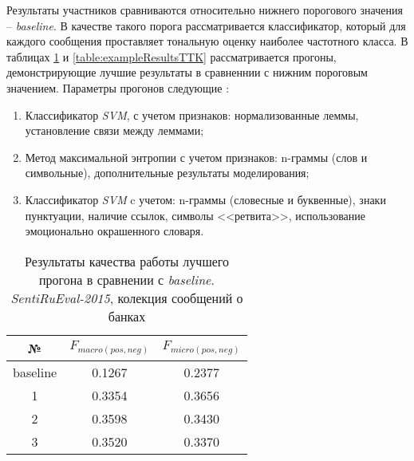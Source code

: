     Результаты участников сравниваются относительно нижнего порогового значения -- {\it baseline}.
    В качестве такого порога рассматривается классификатор, который для каждого
    сообщения проставляет тональную оценку наиболее частотного класса. В таблицах
    \ref{table:exampleResultsBanks} и \ref{table:exampleResultsTTK} рассматривается
    прогоны, демонстрирующие лучшие результаты в сравненнии с нижним пороговым
    значением. Параметры прогонов следующие \cite{tonalityAnalisys}:
    \begin{enumerate}
        \item Классификатор {\it SVM}, с учетом признаков:
            нормализованные леммы, установление связи между леммами;
        \item Метод максимальной энтропии с учетом признаков:
            n-граммы (слов и символьные), дополнительные результаты моделирования;
        \item Классификатор {\it SVM} c учетом: n-граммы (словесные и буквенные),
            знаки пунктуации, наличие ссылок, символы <<ретвита>>, использование
            эмоционально окрашенного словаря.
    \end{enumerate}

    \begin{table}[H]
        \centering
        \caption{Результаты качества работы лучшего прогона в сравнении с {\it baseline}.
        {\it SentiRuEval-2015}, колекция сообщений о банках}
        \label{table:exampleResultsBanks}
        \begin{tabular}{|c|c|c|}
        \hline
        №                       &       $F_{macro(pos, neg)}$        & $F_{micro(pos, neg)}$  \\ \hline
        baseline                &           0.1267                      &       0.2377              \\ \hline \hline
        1                       &           0.3354                      &       0.3656              \\ \hline
        2                       &           0.3598                      &       0.3430              \\ \hline
        3                       &           0.3520                      &       0.3370              \\ \hline
        \end{tabular}
     \end{table}

